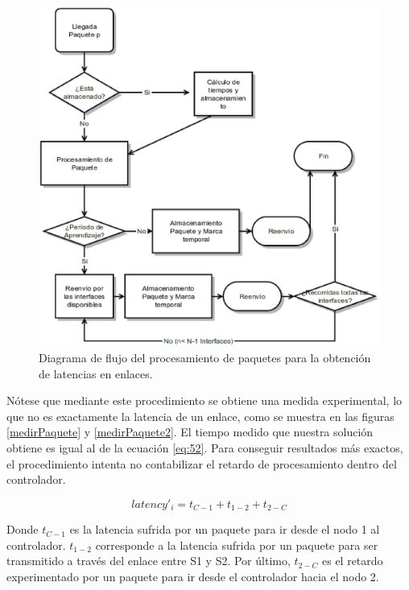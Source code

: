 \documentclass[a4paper,11pt]{book}
\begin{document}
\begin{figure}[tb]
\centering
\includegraphics[scale=0.5]{./figuras/packettimeflow}
\caption[Procesamiento de paquetes para la obtención de latencias.]{Diagrama de flujo del procesamiento de paquetes para la obtención de latencias en enlaces.}\label{packetTime}
\end{figure}

Nótese que mediante este procedimiento se obtiene una medida experimental, lo que no es exactamente la latencia de un enlace, como se muestra en las figuras \ref{medirPaquete} y \ref{medirPaquete2}. El tiempo medido que nuestra solución obtiene es igual al de la ecuación \ref{eq:52}. Para conseguir resultados más exactos, el procedimiento intenta no contabilizar el retardo de procesamiento dentro del controlador.

\begin{equation}
latency'_i = t_{C-1} + t_{1-2} + t_{2-C}
\label{eq:52}
\end{equation}

Donde $t_{C-1}$ es la latencia sufrida por un paquete para ir desde el nodo 1 al controlador. $t_{1-2}$ corresponde a la latencia sufrida por un paquete para ser transmitido a través del enlace entre S1 y S2. Por último, $t_{2-C}$ es el retardo experimentado por un paquete para ir desde el controlador hacia el nodo 2.
\end{document}
